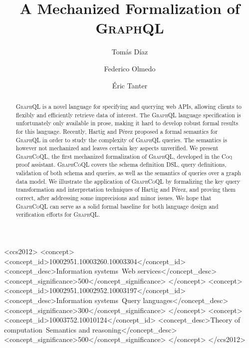 \documentclass[sigplan,screen]{acmart}
\newcommand{\plstyle}[1]{\mbox{\textsc{#1}}\xspace}
\newcommand{\gql}{\plstyle{GraphQL}}
\newcommand{\gcoql}{\plstyle{GraphCoQL}}
\newcommand{\coq}{\plstyle{Coq}}
\begin{document}
\title{A Mechanized Formalization of \gql}

\renewcommand\footnotemark{}

\author{Tomás Díaz}

\author{Federico Olmedo}

\author{Éric Tanter}

\begin{abstract}
\gql is a novel language for specifying and querying web APIs,
allowing clients to flexibly and efficiently retrieve data of
interest. The \gql language specification is unfortunately only
available in prose, making it hard to develop robust formal results
for this language. Recently, Hartig and Pérez proposed a formal
semantics for \gql in order to study the complexity of \gql
queries. The semantics is however not mechanized and leaves certain key aspects unverified. We present \gcoql, the first mechanized formalization of \gql, developed in the \coq proof assistant.  \gcoql covers the schema definition DSL, query definitions, validation of both schema and queries, as well as the semantics of queries over a graph data model.
We illustrate the application of \gcoql by formalizing the key query transformation and interpretation techniques of Hartig and Pérez, and proving them correct, after addressing some imprecisions and minor issues. 
We hope that \gcoql can serve as a solid formal baseline for both language design and verification efforts for \gql.
\end{abstract}

\begin{CCSXML}
<ccs2012>
<concept>
<concept_id>10002951.10003260.10003304</concept_id>
<concept_desc>Information systems~Web services</concept_desc>
<concept_significance>500</concept_significance>
</concept>
<concept>
<concept_id>10002951.10002952.10003197</concept_id>
<concept_desc>Information systems~Query languages</concept_desc>
<concept_significance>300</concept_significance>
</concept>
<concept>
<concept_id>10003752.10010124</concept_id>
<concept_desc>Theory of computation~Semantics and reasoning</concept_desc>
<concept_significance>500</concept_significance>
</concept>
</ccs2012>
\end{CCSXML}
\end{document}
